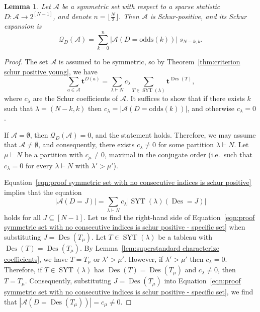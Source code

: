 \documentclass[11pt]{article}
\newtheorem{lemma}[theo]{Lemma}
\theoremstyle{definition}
\providecommand{\ie}{i.e.\ }
\numberwithin{equation}{section}
\newcommand{\Des}{\operatorname{Des}}
\newcommand{\Syt}{\operatorname{SYT}}
\newcommand{\Q}{\mathcal{Q}}
\newcommand{\A}{\mathcal{A}}
\newcommand{\odds}{\mathrm{odds}}
\begin{document}
\begin{lemma}
\label{lem:if two rows and symmetric then schur positive}
    Let $\A$ be a symmetric set with respect to a sparse statistic $D:\A \to 2^{[N-1]}$, and denote $n = \lfloor\frac{N}{2} \rfloor$. Then $\A$ is Schur-positive, and its Schur expansion is
    \[
        \Q_{D} (\A) = \sum_{k=0}^n |\A(D = \odds(k))|\; s_{N-k,k}.
    \]
\end{lemma}

\begin{proof}
    The set $\A$ is assumed to be symmetric, so by Theorem~\ref{thm:criterion schur positive young}, we have
    \begin{equation}\label{eqn:proof symmetric set with no consecutive indices is schur positive}
        \sum_{a \in \A} \boldsymbol{t}^{D(a)} = \sum_{\lambda \vdash N} c_\lambda \sum_{T \in \Syt(\lambda)} \boldsymbol{t}^{\Des(T)},
    \end{equation}
    where $c_\lambda$ are the Schur coefficients of $\A$. It suffices to show that if there exists $k$ such that $\lambda=(N-k,k)$ then $c_\lambda = |\A(D = \odds(k))|$, and otherwise $c_\lambda=0$.

    If $\A = \emptyset$, then $\Q_{D}(\A) = 0$, and the statement holds. Therefore, we may assume that $\A \ne \emptyset$, and consequently, there exists $c_\lambda \ne 0$ for some partition $\lambda \vdash N$. Let $\mu \vdash N$ be a partition with $c_\mu \ne 0$, maximal in the conjugate order (\ie such that $c_\lambda = 0$ for every $\lambda \vdash N$ with $\lambda' > \mu'$).
    
    Equation~\eqref{eqn:proof symmetric set with no consecutive indices is schur positive} implies that the equation
    \begin{equation}\label{eqn:proof symmetric set with no consecutive indices is schur positive - specific set}
        |\A(D = J)| = \sum_{\lambda \vdash N} c_\lambda \left|\Syt(\lambda)(\Des = J)\right|
    \end{equation}
    holds for all $J \subseteq [N-1]$. Let us find the right-hand side of Equation~\eqref{eqn:proof symmetric set with no consecutive indices is schur positive - specific set} when substituting $J = \Des(T_\mu)$. Let $T \in \Syt(\lambda)$ be a tableau with $\Des(T) = \Des(T_\mu)$. By Lemma~\ref{lem:superstandard characterize coefficients}, we have $T = T_\mu$ or $\lambda' > \mu'$. However, if $\lambda' > \mu'$ then $c_\lambda = 0$. Therefore, if $T \in \Syt(\lambda)$ has $\Des(T) = \Des(T_\mu)$ and $c_\lambda \ne 0$, then $T = T_\mu$. Consequently, substituting $J = \Des(T_\mu)$ into Equation~\eqref{eqn:proof symmetric set with no consecutive indices is schur positive - specific set}, we find that $|\A(D = \Des(T_\mu))| = c_\mu \neq 0$.


\end{proof}
\end{document}
